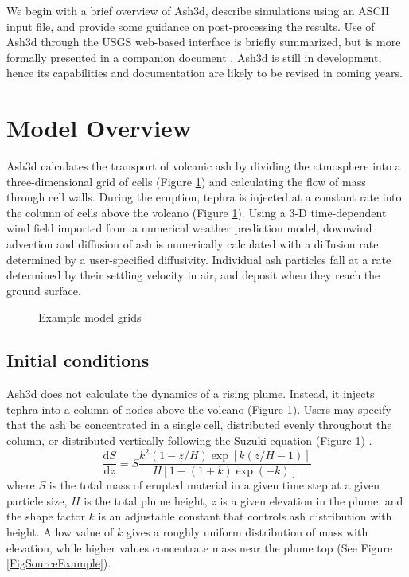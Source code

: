 We begin with a brief overview of Ash3d, describe simulations using an ASCII input file, and provide some guidance on post-processing the results. Use of Ash3d through the USGS web-based interface is briefly summarized, but is more formally presented in a companion document \cite{Mastin13a}. Ash3d is still in development, hence its capabilities and documentation are likely to be revised in coming years.

\section{Model Overview}\label{ChapIntroSecModelOverview}
Ash3d calculates the transport of volcanic ash by dividing the atmosphere into a
three-dimensional grid of cells (Figure \ref{FigAsh3dGrid}) and calculating the flow of mass through cell walls. During the eruption, tephra is injected at a constant
rate into the column of cells above the volcano (Figure \ref{FigAsh3dGrid}).
Using a 3-D time-dependent wind field imported from a numerical weather prediction model, downwind advection and diffusion of ash is numerically calculated with a
diffusion rate determined by a user-specified diffusivity. Individual ash
particles fall at a rate determined by their settling velocity in air, and
deposit when they reach the ground surface.
\begin{figure}[htbp]
\parbox{15cm}{\caption{\label{FigAsh3dGrid}
Example model grids}}
\end{figure}

\subsection{Initial conditions}\label{ChapIntroSecInitCond}
Ash3d does not calculate the dynamics of a rising plume. Instead, it injects
tephra into a column of nodes above the volcano (Figure \ref{FigAsh3dGrid}).
Users may specify
that the ash be concentrated in a single cell, distributed evenly throughout
the column, or distributed vertically following the Suzuki equation
(Figure \ref{FigAsh3dGrid}) \cite{Carey96,Suzuki83}.
\begin{equation}
 \frac{\mathrm{d}S}{\mathrm{d}z} = S\frac{k^2\left( 1-z/H \right)\exp\left[k\left(z/H-1 \right) \right]}
 {H \left[1-\left(1+k \right)\exp \left( -k\right) \right]} \label{EqSuz}
\end{equation}
where $S$ is the total mass of erupted material in a given time step at a
given particle size, $H$ is the total plume height, $z$ is a given elevation
in the plume, and the shape factor $k$ is an adjustable constant that controls
ash distribution with height. A low value of $k$ gives a roughly uniform
distribution of mass with elevation, while higher values concentrate mass
near the plume top (See Figure \ref{FigSourceExample}).

